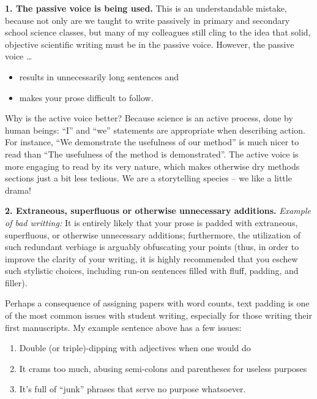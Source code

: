 \documentclass[]{book}
\providecommand{\tightlist}{%
  \setlength{\itemsep}{0pt}\setlength{\parskip}{0pt}}
\theoremstyle{definition}
\theoremstyle{definition}
\theoremstyle{definition}
\theoremstyle{remark}
\begin{document}
\textbf{1. The passive voice is being used.}
This is an understandable mistake, because not only are we taught to write passively in primary and secondary school science classes, but many of my colleagues still cling to the idea that solid, objective scientific writing must be in the passive voice. However, the passive voice \ldots{}

\begin{itemize}
\tightlist
\item
  results in unnecessarily long sentences and\\
\item
  makes your prose difficult to follow.
\end{itemize}

Why is the active voice better? Because science is an active process, done by human beings: ``I'' and ``we'' statements are appropriate when describing action. For instance, ``We demonstrate the usefulness of our method'' is much nicer to read than ``The usefulness of the method is demonstrated''. The active voice is more engaging to read by its very nature, which makes otherwise dry methods sections just a bit less tedious. We are a storytelling species -- we like a little drama!

\textbf{2. Extraneous, superfluous or otherwise unnecessary additions.}
\emph{Example of bad writting:} It is entirely likely that your prose is padded with extraneous, superfluous, or otherwise unnecessary additions; furthermore, the utilization of such redundant verbiage is arguably obfuscating your points (thus, in order to improve the clarity of your writing, it is highly recommended that you eschew such stylistic choices, including run-on sentences filled with fluff, padding, and filler).

Perhaps a consequence of assigning papers with word counts, text padding is one of the most common issues with student writing, especially for those writing their first manuscripts. My example sentence above has a few issues:

\begin{enumerate}
\def\labelenumi{\arabic{enumi}.}
\tightlist
\item
  Double (or triple)-dipping with adjectives when one would do
\item
  It crams too much, abusing semi-colons and parentheses for useless purposes
\item
  It's full of ``junk'' phrases that serve no purpose whatsoever.
\end{enumerate}
\end{document}
